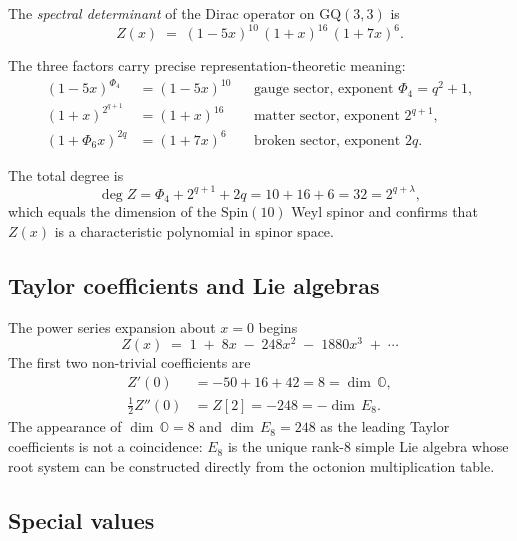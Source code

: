 \begin{definition}
The \emph{spectral determinant} of the Dirac operator on $\mathrm{GQ}(3,3)$ is
\begin{equation}
  \label{eq:Z_def}
  Z(x) \;=\; (1-5x)^{10}\,(1+x)^{16}\,(1+7x)^{6}.
\end{equation}
\end{definition}

\noindent
The three factors carry precise representation-theoretic meaning:
\begin{align}
  (1-5x)^{\Phi_4} &= (1-5x)^{10} && \text{gauge sector, exponent }
                    \Phi_4 = q^2+1, \label{eq:Z_gauge}\\
  (1+x)^{2^{q+1}} &= (1+x)^{16}  && \text{matter sector, exponent }
                    2^{q+1}, \label{eq:Z_matter}\\
  (1+\Phi_6 x)^{2q} &= (1+7x)^{6}&& \text{broken sector, exponent }
                    2q. \label{eq:Z_broken}
\end{align}

The total degree is
\[
  \deg Z = \Phi_4 + 2^{q+1} + 2q = 10 + 16 + 6 = 32 = 2^{q+\lambda},
\]
which equals the dimension of the $\mathrm{Spin}(10)$ Weyl spinor and
confirms that $Z(x)$ is a characteristic polynomial in spinor space.

\subsection{Taylor coefficients and Lie algebras}

The power series expansion about $x=0$ begins
\begin{equation}
  \label{eq:Z_taylor}
  Z(x) \;=\; 1 \;+\; 8x \;-\; 248x^2 \;-\; 1880x^3 \;+\;\cdots
\end{equation}
The first two non-trivial coefficients are
\begin{align}
  Z'(0) &= -50 + 16 + 42 = 8 = \dim\,\mathbb{O},
           \label{eq:Z_prime_octonion}\\
  \tfrac{1}{2}Z''(0) &= Z[2] = -248 = -\dim\,E_8.
           \label{eq:Z_dbl_prime_E8}
\end{align}
The appearance of $\dim\,\mathbb{O}=8$ and $\dim\,E_8=248$ as the leading
Taylor coefficients is not a coincidence: $E_8$ is the unique rank-8 simple Lie
algebra whose root system can be constructed directly from the
octonion multiplication table.

\subsection{Special values}

